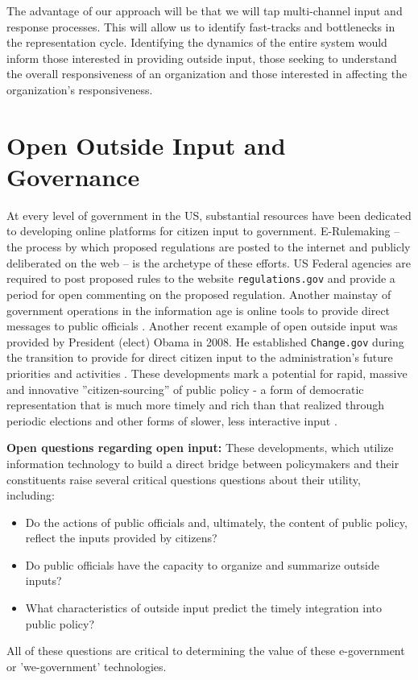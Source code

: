 The advantage of our approach will be that we will tap multi-channel input and response processes. This will allow us to identify fast-tracks and bottlenecks in the representation cycle. Identifying the dynamics of the entire system would inform those interested in providing outside input, those seeking to understand the overall responsiveness of an organization and those interested in affecting the organization's responsiveness.



\section{Open Outside Input and Governance}

At every level of government in the US, substantial resources have been dedicated to developing online platforms for citizen input to government. E-Rulemaking \cite{Coglianese2004} -- the process by which proposed regulations are posted to the internet and publicly deliberated on the web -- is the archetype of these efforts. US Federal agencies are required to post proposed rules to the website \texttt{regulations.gov} and provide a period for open commenting on the proposed regulation. Another mainstay of government operations in the information age is online tools to provide direct messages to public officials \cite{Balla2007}. Another recent example of open outside input was provided by President (elect) Obama in 2008. He established \texttt{Change.gov} during the transition to provide for direct citizen input to the administration's future priorities and activities \cite{Borins2009}. These developments mark a potential for rapid, massive and innovative ''citizen-sourcing'' of public policy - a form of democratic representation that is much more timely and rich than that realized through periodic elections and other forms of slower, less interactive input  \cite{Linders2012}.  

{\bf Open questions regarding open input:} These developments, which utilize information technology to build a direct bridge between policymakers and their constituents raise several critical questions questions about their utility, including: 
\begin{itemize}
\item Do the actions of public officials and, ultimately, the content of public policy, reflect the inputs provided by citizens? 
\item Do public officials have the capacity to organize and summarize outside inputs? 
\item What characteristics of outside input predict the timely integration into public policy?
\end{itemize} All of these questions are critical to determining the value of these e-government or 'we-government' technologies.


